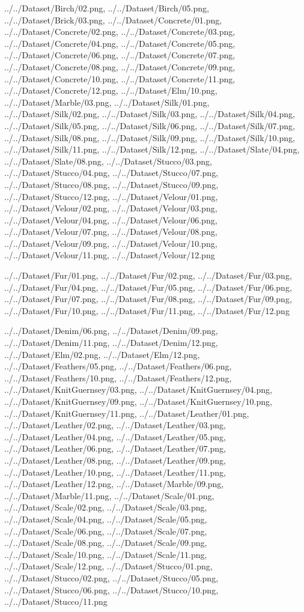 \documentclass[12pt,a4paper]{article}
\begin{document}
\begin{singlespace}
{../../Dataset/Birch/02.png,
../../Dataset/Birch/05.png,
../../Dataset/Brick/03.png,
../../Dataset/Concrete/01.png,
../../Dataset/Concrete/02.png,
../../Dataset/Concrete/03.png,
../../Dataset/Concrete/04.png,
../../Dataset/Concrete/05.png,
../../Dataset/Concrete/06.png,
../../Dataset/Concrete/07.png,
../../Dataset/Concrete/08.png,
../../Dataset/Concrete/09.png,
../../Dataset/Concrete/10.png,
../../Dataset/Concrete/11.png,
../../Dataset/Concrete/12.png,
../../Dataset/Elm/10.png,
../../Dataset/Marble/03.png,
../../Dataset/Silk/01.png,
../../Dataset/Silk/02.png,
../../Dataset/Silk/03.png,
../../Dataset/Silk/04.png,
../../Dataset/Silk/05.png,
../../Dataset/Silk/06.png,
../../Dataset/Silk/07.png,
../../Dataset/Silk/08.png,
../../Dataset/Silk/09.png,
../../Dataset/Silk/10.png,
../../Dataset/Silk/11.png,
../../Dataset/Silk/12.png,
../../Dataset/Slate/04.png,
../../Dataset/Slate/08.png,
../../Dataset/Stucco/03.png,
../../Dataset/Stucco/04.png,
../../Dataset/Stucco/07.png,
../../Dataset/Stucco/08.png,
../../Dataset/Stucco/09.png,
../../Dataset/Stucco/12.png,
../../Dataset/Velour/01.png,
../../Dataset/Velour/02.png,
../../Dataset/Velour/03.png,
../../Dataset/Velour/04.png,
../../Dataset/Velour/06.png,
../../Dataset/Velour/07.png,
../../Dataset/Velour/08.png,
../../Dataset/Velour/09.png,
../../Dataset/Velour/10.png,
../../Dataset/Velour/11.png,
../../Dataset/Velour/12.png}

{../../Dataset/Fur/01.png,
../../Dataset/Fur/02.png,
../../Dataset/Fur/03.png,
../../Dataset/Fur/04.png,
../../Dataset/Fur/05.png,
../../Dataset/Fur/06.png,
../../Dataset/Fur/07.png,
../../Dataset/Fur/08.png,
../../Dataset/Fur/09.png,
../../Dataset/Fur/10.png,
../../Dataset/Fur/11.png,
../../Dataset/Fur/12.png}

{../../Dataset/Denim/06.png,
../../Dataset/Denim/09.png,
../../Dataset/Denim/11.png,
../../Dataset/Denim/12.png,
../../Dataset/Elm/02.png,
../../Dataset/Elm/12.png,
../../Dataset/Feathers/05.png,
../../Dataset/Feathers/06.png,
../../Dataset/Feathers/10.png,
../../Dataset/Feathers/12.png,
../../Dataset/KnitGuernsey/03.png,
../../Dataset/KnitGuernsey/04.png,
../../Dataset/KnitGuernsey/09.png,
../../Dataset/KnitGuernsey/10.png,
../../Dataset/KnitGuernsey/11.png,
../../Dataset/Leather/01.png,
../../Dataset/Leather/02.png,
../../Dataset/Leather/03.png,
../../Dataset/Leather/04.png,
../../Dataset/Leather/05.png,
../../Dataset/Leather/06.png,
../../Dataset/Leather/07.png,
../../Dataset/Leather/08.png,
../../Dataset/Leather/09.png,
../../Dataset/Leather/10.png,
../../Dataset/Leather/11.png,
../../Dataset/Leather/12.png,
../../Dataset/Marble/09.png,
../../Dataset/Marble/11.png,
../../Dataset/Scale/01.png,
../../Dataset/Scale/02.png,
../../Dataset/Scale/03.png,
../../Dataset/Scale/04.png,
../../Dataset/Scale/05.png,
../../Dataset/Scale/06.png,
../../Dataset/Scale/07.png,
../../Dataset/Scale/08.png,
../../Dataset/Scale/09.png,
../../Dataset/Scale/10.png,
../../Dataset/Scale/11.png,
../../Dataset/Scale/12.png,
../../Dataset/Stucco/01.png,
../../Dataset/Stucco/02.png,
../../Dataset/Stucco/05.png,
../../Dataset/Stucco/06.png,
../../Dataset/Stucco/10.png,
../../Dataset/Stucco/11.png}


\end{singlespace}
\end{document}
